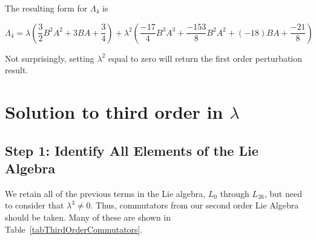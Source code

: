 \documentclass{article}
\begin{document}
The resulting form for $\Lambda_{4}$ is

\begin{equation}
\Lambda_{4} = \lambda(\frac{3}{2}B^{2}A^{2}+3BA+\frac{3}{4})+\lambda^{2}(\frac{-17}{4}B^{3}A^{3}+\frac{-153}{8}B^{2}A^{2}+(-18)BA+\frac{-21}{8})
\end{equation}

Not surprisingly, setting $\lambda^{2}$ equal to zero will return the first order perturbation result.

\clearpage
\newpage

\section{Solution to third order in $\lambda$}

\subsection{Step 1: Identify All Elements of the Lie Algebra}

We retain all of the previous terms in the Lie algebra, $L_{0}$ through $L_{26}$, but need to consider that $\lambda^{3} \neq 0$.  Thus, commutators from our second order Lie Algebra should be taken.  Many of these are shown in Table~\ref{tabThirdOrderCommutators}.
\end{document}
